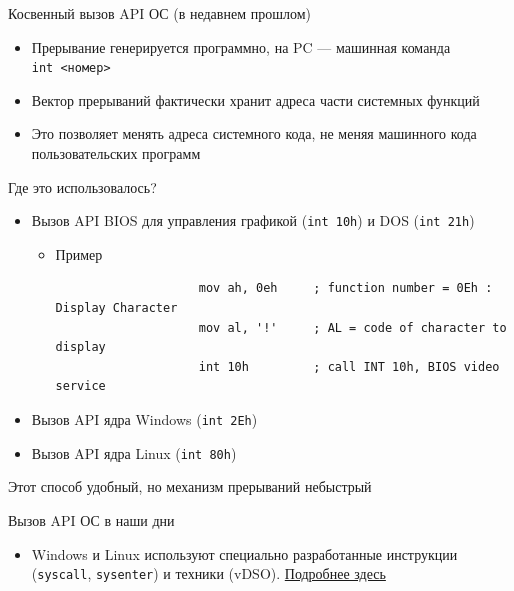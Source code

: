 \documentclass[xetex,aspectratio=43]{beamer}
\begin{document}
\begin{frame}[fragile]{Косвенный вызов API ОС (в недавнем прошлом)}
	\begin{itemize}
		\tightlist
		\item
		Прерывание генерируется программно, на PC --- машинная команда
		\texttt{int\ \textless{}номер\textgreater{}}
		\item
		Вектор прерываний фактически хранит адреса части системных функций
		\item
		Это позволяет менять адреса системного кода, не меняя машинного кода
		пользовательских программ
	\end{itemize}

	\begin{block}{Где это использовалось?}
		\begin{itemize}
			\tightlist
			\item
			Вызов API BIOS для управления графикой (\texttt{int 10h}) и DOS
			(\texttt{int 21h})

			\begin{itemize}
				\tightlist
				\item
				Пример

				\begin{verbatim}
                    mov ah, 0eh     ; function number = 0Eh : Display Character
                    mov al, '!'     ; AL = code of character to display
                    int 10h         ; call INT 10h, BIOS video service
				\end{verbatim}
			\end{itemize}
		\end{itemize}

		\begin{itemize}
			\tightlist
			\item
			Вызов API ядра Windows (\texttt{int 2Eh})
			\item
			Вызов API ядра Linux (\texttt{int 80h})
		\end{itemize}

		Этот способ удобный, но механизм прерываний небыстрый

		\pause
	\end{block}
\end{frame}

\begin{frame}{Вызов API ОС в наши дни}
	\begin{itemize}
		\item
		Windows и Linux используют специально разработанные инструкции
		(\texttt{syscall}, \texttt{sysenter}) и техники (vDSO). \href{https://habr.com/ru/post/347596/}{Подробнее здесь}
	\end{itemize}
\end{frame}
\end{document}
